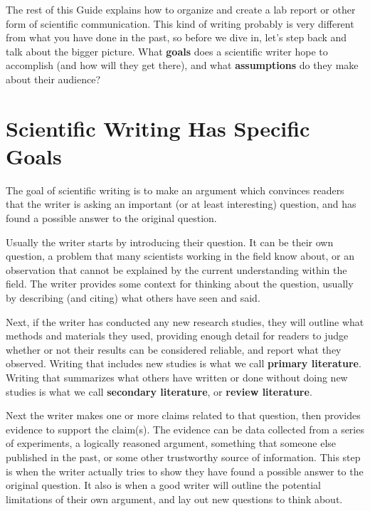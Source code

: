 \documentclass[
]{book}
\begin{document}
The rest of this Guide explains how to organize and create a lab report or other form of scientific communication. This kind of writing probably is very different from what you have done in the past, so before we dive in, let's step back and talk about the bigger picture. What \textbf{goals} does a scientific writer hope to accomplish (and how will they get there), and what \textbf{assumptions} do they make about their audience?

\hypertarget{scientific-writing-has-specific-goals}{%
\section{Scientific Writing Has Specific Goals}\label{scientific-writing-has-specific-goals}}

The goal of scientific writing is to make an argument which convinces readers that the writer is asking an important (or at least interesting) question, and has found a possible answer to the original question.

Usually the writer starts by introducing their question. It can be their own question, a problem that many scientists working in the field know about, or an observation that cannot be explained by the current understanding within the field. The writer provides some context for thinking about the question, usually by describing (and citing) what others have seen and said.

Next, if the writer has conducted any new research studies, they will outline what methods and materials they used, providing enough detail for readers to judge whether or not their results can be considered reliable, and report what they observed. Writing that includes new studies is what we call \textbf{primary literature}. Writing that summarizes what others have written or done without doing new studies is what we call \textbf{secondary literature}, or \textbf{review literature}.

Next the writer makes one or more claims related to that question, then provides evidence to support the claim(s). The evidence can be data collected from a series of experiments, a logically reasoned argument, something that someone else published in the past, or some other trustworthy source of information. This step is when the writer actually tries to show they have found a possible answer to the original question. It also is when a good writer will outline the potential limitations of their own argument, and lay out new questions to think about.
\end{document}
